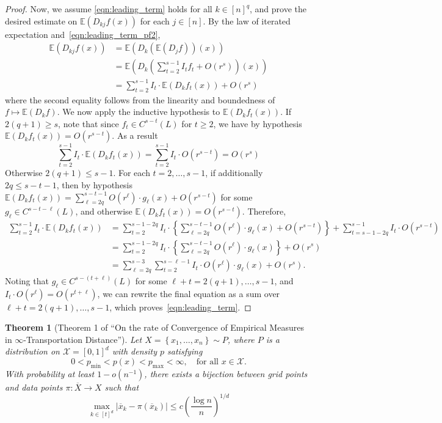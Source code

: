 \documentclass{article}
\newcommand{\abs}[1]{\left \lvert #1 \right \rvert}
\newcommand{\set}[1]{\left\{#1\right\}}
\newcommand{\1}{\mathbf{1}}
\newcommand{\Xset}{\mathcal{X}}
\newcommand{\Ebb}{\mathbb{E}}
\theoremstyle{alden}
\theoremstyle{aldenthm}
\newtheorem{theorem}{Theorem}
\theoremstyle{definition}
\theoremstyle{remark}
\begin{document}
\begin{proof}
	Now, we assume \eqref{eqn:leading_term} holds for all $k \in [n]^q$, and prove the desired estimate on $\Ebb(D_{kj}f(x))$ for each $j \in [n]$. By the law of iterated expectation and~\eqref{eqn:leading_term_pf2},
	\begin{align*}
	\Ebb(D_{kj}f(x)) & = \Ebb(D_k(\Ebb(D_jf))(x)) \\
	& = \Ebb\left(D_k\left(\sum_{t = 2}^{s - 1} I_t f_t + O(r^s)\right)(x)\right) \\
	& = \sum_{t = 2}^{s - 1} I_t \cdot \Ebb(D_kf_t(x)) + O(r^s)
	\end{align*}
	where the second equality follows from the linearity and boundedness of $f \mapsto \Ebb(D_kf)$. We now apply the inductive hypothesis to $\Ebb(D_kf_t(x))$. If $2(q + 1) \geq s$, note that since $f_t \in C^{s - t}(L)$ for $t \geq 2$, we have by hypothesis $\Ebb(D_kf_t(x)) = O(r^{s - t})$. As a result
	\begin{equation*}
	\sum_{t = 2}^{s - 1} I_t \cdot \Ebb(D_kf_t(x)) = \sum_{t = 2}^{s - 1} I_t \cdot O(r^{s - t}) = O(r^s)
	\end{equation*} 
	Otherwise $2(q + 1) \leq s - 1$. For each $t = 2,\ldots, s - 1$, if additionally  $2q \leq s - t - 1$, then by hypothesis $\Ebb(D_kf_t(x)) = \sum_{\ell = 2q}^{s - t - 1} O(r^{\ell}) \cdot g_{\ell}(x) + O(r^{s - t})$ for some $g_{\ell} \in C^{s - t - \ell}(L)$, and otherwise $\Ebb(D_kf_t(x)) = O(r^{s - t})$. Therefore,
	\begin{align*}
	\sum_{t = 2}^{s - 1} I_t \cdot \Ebb(D_kf_t(x)) & = \sum_{t = 2}^{s - 1 - 2q} I_t \cdot \left\{\sum_{\ell = 2q}^{s - t - 1} O(r^{\ell}) \cdot g_{\ell}(x) + O(r^{s - t}) \right\} + \sum_{t = s - 1 - 2q}^{s - 1}I_{t} \cdot O(r^{s - t}) \\
	& = \sum_{t = 2}^{s - 1 - 2q} I_t \cdot \left\{\sum_{\ell = 2q}^{s - t - 1} O(r^{\ell}) \cdot g_{\ell}(x)\right\}  + O(r^s) \\
	& = \sum_{\ell = 2q}^{s - 3} \sum_{t = 2}^{s - \ell - 1} I_t \cdot O(r^{\ell}) \cdot g_{\ell}(x) + O(r^s).
	\end{align*}
	Noting that $g_{\ell} \in C^{s - (t + \ell)}(L)$ for some $\ell + t = 2(q + 1),\ldots,s - 1$, and $I_t \cdot O(r^{\ell}) = O(r^{t + \ell})$, we can rewrite the final equation as a sum over $\ell + t = 2(q + 1),\ldots,s - 1$, which proves~\eqref{eqn:leading_term}.
\end{proof}

\begin{theorem}[Theorem 1 of ``On the rate of Convergence of Empirical Measures in $\infty$-Transportation Distance'']
	Let $X = \set{x_1,\ldots,x_n} \sim P$, where $P$ is a distribution on $\Xset = [0,1]^d$ with density $p$ satisfying
	\begin{equation*}
	0 < p_{\min} < p(x) < p_{\max} < \infty, \quad \textrm{for all $x \in \mathcal{X}$.}
	\end{equation*} 
	With probability at least $1 - o(n^{-1})$, there exists a bijection between grid points and data points $\pi: \overline{X} \to X$ such that
	\begin{equation}
	\label{eqn:transport_distance}
	\max_{k \in [t]^d} \abs{\overline{x}_k - \pi(\overline{x}_k)} \leq c \left(\frac{\log n}{n}\right)^{1/d}
	\end{equation}
\end{theorem}
\end{document}
